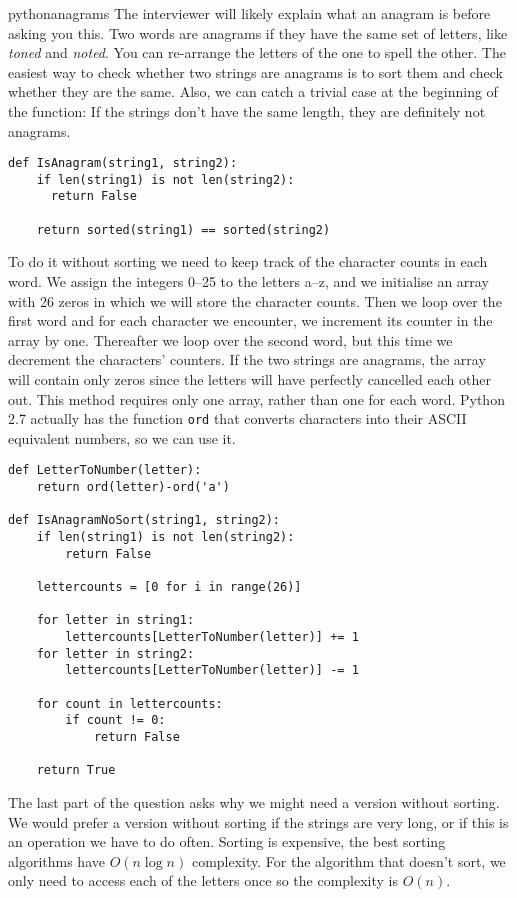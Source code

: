 \begin{answer}{pythonanagrams}
The interviewer will likely explain what an anagram is before asking you this.
Two words are anagrams if they have the same set of letters, like \emph{toned} and \emph{noted}.
You can re-arrange the letters of the one to spell the other.
The easiest way to check whether two strings are anagrams is to sort them and check whether they are the same.
Also, we can catch a trivial case at the beginning of the function: If the strings don't have the same length, they are definitely not anagrams.
\begin{verbatim}
def IsAnagram(string1, string2):
    if len(string1) is not len(string2):
      return False

    return sorted(string1) == sorted(string2)
\end{verbatim}
%
To do it without sorting we need to keep track of the character counts in each word.
We assign
the integers 0--25
to
the letters a--z, and we initialise an array with 26 zeros in which we will store the character counts.
Then we loop over the first word and for each character we encounter, we increment its counter in the array by one.
Thereafter we loop over the second word, but this time we decrement the characters' counters.
If the two strings are anagrams, the array will contain only zeros since the letters will have perfectly cancelled each other out.
This method requires only one array, rather than one for each word.
Python 2.7 actually has the function \verb+ord+ that converts characters into their ASCII equivalent numbers, so we can use it.
\begin{verbatim}
def LetterToNumber(letter):
    return ord(letter)-ord('a')

def IsAnagramNoSort(string1, string2):
    if len(string1) is not len(string2):
        return False

    lettercounts = [0 for i in range(26)]

    for letter in string1:
        lettercounts[LetterToNumber(letter)] += 1
    for letter in string2:
        lettercounts[LetterToNumber(letter)] -= 1

    for count in lettercounts:
        if count != 0:
            return False

    return True
\end{verbatim}

The last part of the question asks why we might need a version without sorting.
We would prefer a version without sorting if the strings are very long, or if this is an operation we have to do often.
Sorting is expensive, the best sorting algorithms have $O(n\log{n})$ complexity.
For the algorithm that doesn't sort, we only need to access each of the letters once so the complexity is $O(n)$.
\end{answer}
